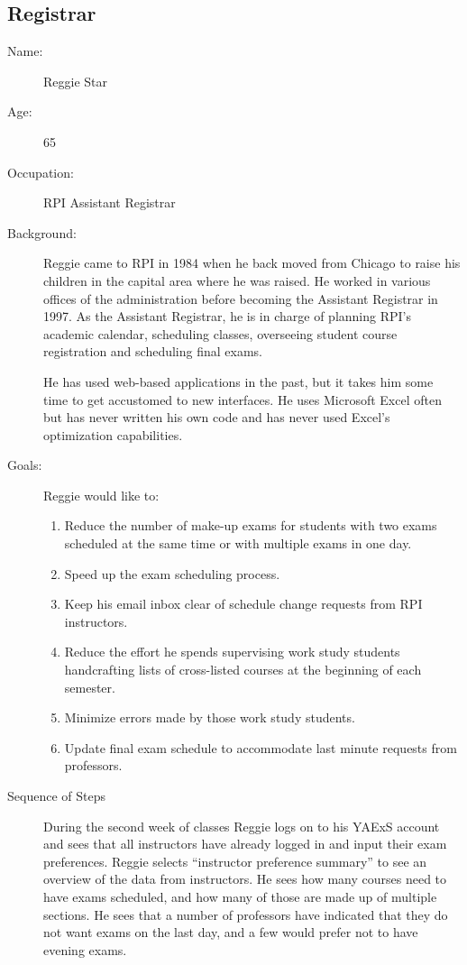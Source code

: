 \documentclass[11pt]{article}
\begin{document}
\subsection{Registrar}  %

\begin{description}
\item[Name:] Reggie Star
\item[Age:]  65
\item[Occupation:] RPI Assistant Registrar
\item[Background:] Reggie came to RPI in 1984 when he  back moved from
 Chicago to raise his children in the capital area where he was raised. 
He worked in various offices of the administration before becoming
 the Assistant Registrar in 1997.  As the Assistant Registrar, he is in charge of planning RPI's academic calendar,  scheduling classes, overseeing student course registration and scheduling final exams.

He has used web-based applications in the past, but it takes him some 
time to get accustomed to new interfaces. 
He uses Microsoft Excel often but has never written his own code
 and has never used Excel’s optimization capabilities.

\item[Goals:]
Reggie would like to:
\begin{enumerate}
\item Reduce the number of make-up exams for students with two exams scheduled at the same time or with multiple exams in one day.
\item Speed up the exam scheduling process.
\item Keep his email inbox clear of schedule change requests from RPI instructors.
\item Reduce the effort he spends supervising work study students handcrafting lists of cross-listed courses at the beginning of each semester.
\item Minimize errors made by those work study students.
\item Update final exam schedule to accommodate last minute requests 
from professors.
\end{enumerate}

\item[Sequence of Steps]
During the second week of classes Reggie logs on to his YAExS account and
 sees that all instructors have already logged in and input their
 exam preferences.  
Reggie selects “instructor preference summary”  to see an overview of
 the data from instructors. He sees how many courses need to have exams
 scheduled, and how many of those are made up of multiple sections. 
He sees that a number of professors have indicated that they do not
want exams on the last day, and a few would prefer not to have evening exams.


\end{description}
\end{document}
